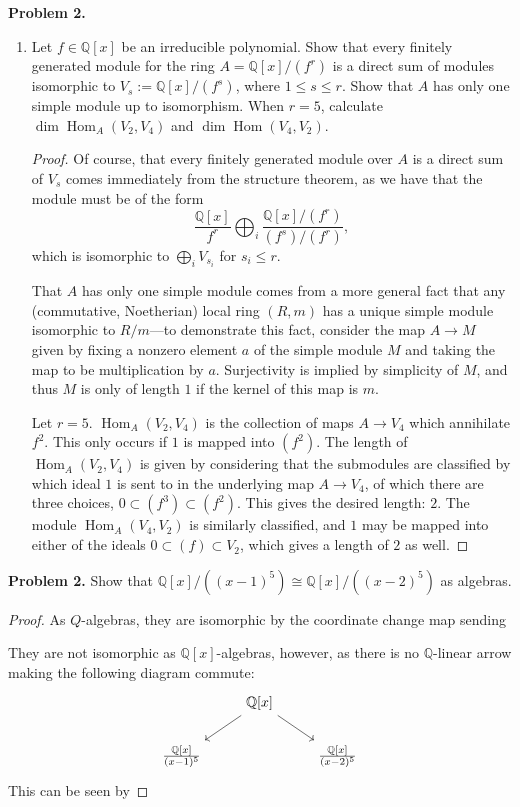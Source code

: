 \documentclass[reqno]{amsart}
\DeclareMathOperator{\Hom}{Hom}
\theoremstyle{definition}
\theoremstyle{remark}
\newcommand{\prob}[1] {
  \textbf{Problem #1.}
}
\begin{document}
\prob{2}
\begin{enumerate}
  \item Let $f \in \mathbb{Q}[x]$ be an irreducible polynomial. Show that every
    finitely generated module for the ring $A = \mathbb{Q}[x]/(f^r)$ is a direct
    sum of modules isomorphic to $V_s := \mathbb{Q}[x]/(f^s)$, where $1 \leq s
    \leq r$. Show that $A$ has only one simple module up to isomorphism. When $r
    = 5$, calculate $\dim \Hom_A(V_2, V_4)$ and $\dim \Hom(V_4, V_2)$.

    \begin{proof}
      Of course, that every finitely generated module over $A$ is a direct sum
      of $V_s$ comes immediately from the structure theorem, as we have that the
      module must be of the form
      \[
        \frac{\mathbb{Q}[x]}{f^r} \bigoplus_i
        \frac{\mathbb{Q}[x]/(f^r)}{(f^s)/(f^r)},
      \]
      which is isomorphic to $\bigoplus_i V_{s_i}$ for $s_i \leq r$.

      That $A$ has only one simple module comes from a more general fact that
      any (commutative, Noetherian) local ring $(R, m)$ has a unique simple
      module isomorphic to $R/m$---to demonstrate this fact, consider the map $A
      \to M$ given by fixing a nonzero element $a$ of the simple module $M$ and
      taking the map to be multiplication by $a$. Surjectivity is implied by
      simplicity of $M$, and thus $M$ is only of length $1$ if the kernel of
      this map is $m$.

      Let $r=5$. $\Hom_A(V_2, V_4)$ is the collection of maps $A \to V_4$ which
      annihilate $f^2$. This only occurs if $1$ is mapped into $(f^2)$. The
      length of $\Hom_A(V_2, V_4)$ is given by considering that the submodules
      are classified by which ideal $1$ is sent to in the underlying map $A \to
      V_4$, of which there are three choices, $0 \subset (f^3) \subset (f^2)$.
      This gives the desired length: $2$. The module $\Hom_A(V_4, V_2)$ is
      similarly classified, and $1$ may be mapped into either of the ideals $0
      \subset (f) \subset V_2$, which gives a length of $2$ as well.
    \end{proof}
\end{enumerate}

\prob{2} Show that $\mathbb{Q}[x]/((x-1)^5) \cong \mathbb{Q}[x]/((x-2)^5)$ as
algebras.

\begin{proof}
  As $Q$-algebras, they are isomorphic by the coordinate change map sending 

  They are not isomorphic as $\mathbb{Q}[x]$-algebras, however, as there is no
  $\mathbb{Q}$-linear arrow making the following diagram commute:
  \[
    \begin{tikzcd}
      &\mathbb{Q}[x] \ar[dr] \ar[dl] & \\
      \frac{\mathbb{Q}[x]}{(x-1)^5} & & \frac{\mathbb{Q}[x]}{(x-2)^5}
    \end{tikzcd}
  \]
  This can be seen by 
\end{proof}
\end{document}
